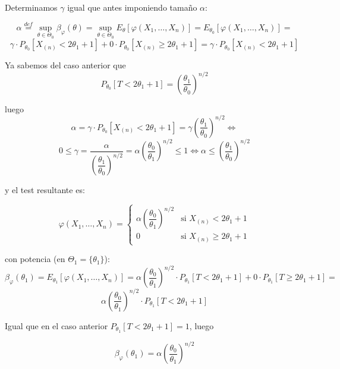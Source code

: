\documentclass[12pt]{article}
\begin{document}
\begin{ejercicio}
        Determinamos $\gamma$ igual que antes imponiendo tamaño $\alpha$:

        $$\alpha \stackrel{def} = \sup_{\theta \in \Theta_0} \beta_{\varphi}(\theta) =  \sup_{\theta \in \Theta_0} E_\theta[\varphi(X_1, \ldots, X_n)] = E_{\theta_0}[\varphi(X_1, \ldots, X_n)] = $$
        $$\gamma \cdot P_{\theta_0}[X_{(n)} < 2\theta_1 + 1] + 0 \cdot P_{\theta_0}[X_{(n)} \geq 2\theta_1 + 1] = \gamma \cdot P_{\theta_0}[X_{(n)} < 2\theta_1 + 1] $$

        Ya sabemos del caso anterior que 
        $$P_{\theta_0}[T < 2\theta_1 + 1] = \left( \dfrac{\theta_1}{\theta_0} \right)^{n/2}$$

        luego
        $$\alpha = \gamma \cdot P_{\theta_0}[X_{(n)} < 2\theta_1 + 1] = \gamma \left( \dfrac{\theta_1}{\theta_0} \right)^{n/2} \iff $$
        $$0 \leq \gamma = \dfrac{\alpha}{\left( \dfrac{\theta_1}{\theta_0} \right)^{n/2}} = \alpha \left( \dfrac{\theta_0}{\theta_1} \right)^{n/2}  \leq 1 \iff \alpha \leq \left( \dfrac{\theta_1}{\theta_0} \right)^{n/2}$$

        y el test resultante es:

        $$\varphi(X_1, \ldots, X_n) = 
            \begin{cases}
                \alpha \left( \dfrac{\theta_0}{\theta_1} \right)^{n/2} &\text{si } X_{(n)} < 2\theta_1 + 1 \\
                0 &\text{si } X_{(n)} \geq 2\theta_1 + 1
            \end{cases}$$      
            
        con potencia (en $\Theta_1 = \{\theta_1\}$):
        $$\beta_{\varphi}(\theta_1) = E_{\theta_1}[\varphi(X_1, \ldots, X_n)] = \alpha \left( \dfrac{\theta_0}{\theta_1} \right)^{n/2} \cdot P_{\theta_1}[T < 2\theta_1 + 1] + 
        0 \cdot P_{\theta_1}[T \geq 2\theta_1 + 1] = $$
        $$\alpha \left( \dfrac{\theta_0}{\theta_1} \right)^{n/2} \cdot P_{\theta_1}[T < 2\theta_1 + 1]$$

        Igual que en el caso anterior $P_{\theta_1}[T < 2\theta_1 + 1] = 1$, luego

        $$\beta_{\varphi}(\theta_1) = \alpha \left( \dfrac{\theta_0}{\theta_1} \right)^{n/2}$$
    \end{ejercicio}
\end{document}
